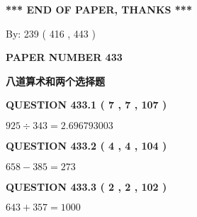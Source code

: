 \documentclass{ctexart}
\begin{document}
   
 \vspace{0.2in}
 
   
   
   
   
\vspace{1.0in} 
{\textbf{\large{ *** END OF PAPER, THANKS *** }}} 
   
   
\hspace{1.0in} By: 
 239 ( 416 ,  443 )
   
   
   
   
\newpage 
\setcounter{page}{ 
   433001 } 
   
   
   
   
 {\textbf{ \Large{ PAPER NUMBER  433  }}}
   
   
\vspace{0.2in}
   
   
   
   
   
   
 \vspace{0.2in}
{\LARGE {\textbf{ 八道算术和两个选择题}}}
   
   
  
\vspace{0.2in}
  
{\textbf{\Large{QUESTION
433.1 
 ( 7 , 7 , 107 )
}}}
  
  
 
 

$ %
925 \div  %
343=   %
2.696793003$
 
 
  
\vspace{0.2in}
  
{\textbf{\Large{QUESTION
433.2 
 ( 4 , 4 , 104 )
}}}
  
  
 
 

$ %
658 -  %
385=   %
273$
 
 
  
\vspace{0.2in}
  
{\textbf{\Large{QUESTION
433.3 
 ( 2 , 2 , 102 )
}}}
  
  
 
 

$ %
643 +  %
357=   %
1000$
 
 
  
\vspace{0.2in}
  
\end{document}
